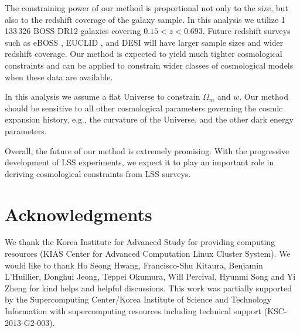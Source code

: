 \documentclass[iop]{emulateapj}
\begin{document}
The constraining power of our method is proportional not only to the size, 
but also to the redshift coverage of the galaxy sample.
In this analysis we utilize 1\,133\,326 BOSS DR12 galaxies covering $0.15< z < 0.693$.
Future redshift surveys such as eBOSS \citep{eBOSS}, EUCLID \citep{EUCLID}, and DESI \citep{DESI}
will have larger sample sizes and wider redshift coverage.
Our method is expected to yield much tighter cosmological constraints
and can be applied to constrain wider classes of 
cosmological models when these data are available.

In this analysis we assume a flat Universe to constrain $\Omega_m$ and $w$.
Our method should be sensitive to all other cosmological parameters governing the cosmic expansion history,
e.g., the curvature of the Universe, 
and the other dark energy parameters.

Overall, the future of our method is extremely promising. 
With the progressive development of LSS experiments, 
we expect it to play an important role in deriving cosmological constraints from LSS surveys.



\section*{Acknowledgments}

We thank the Korea Institute for Advanced Study for providing computing resources (KIAS Center for Advanced Computation Linux Cluster System).
We would like to thank Ho Seong Hwang, Francisco-Shu Kitaura, Benjamin L'Huillier, Donghui Jeong, Teppei Okumura, Will Percival, Hyunmi Song 
and Yi Zheng for kind helps and helpful discussions.
This work was partially supported by the
Supercomputing Center/Korea Institute of Science and
Technology Information with supercomputing resources
including technical support (KSC-2013-G2-003).
\end{document}
